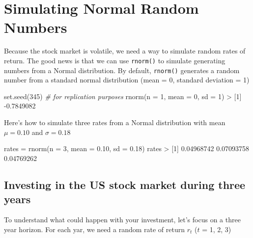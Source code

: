 \documentclass[
]{book}
\newenvironment{Shaded}{\begin{snugshade}}{\end{snugshade}}
\newcommand{\AttributeTok}[1]{\textcolor[rgb]{0.77,0.63,0.00}{#1}}
\newcommand{\CommentTok}[1]{\textcolor[rgb]{0.56,0.35,0.01}{\textit{#1}}}
\newcommand{\DecValTok}[1]{\textcolor[rgb]{0.00,0.00,0.81}{#1}}
\newcommand{\FloatTok}[1]{\textcolor[rgb]{0.00,0.00,0.81}{#1}}
\newcommand{\FunctionTok}[1]{\textcolor[rgb]{0.00,0.00,0.00}{#1}}
\newcommand{\NormalTok}[1]{#1}
\newcommand{\OtherTok}[1]{\textcolor[rgb]{0.56,0.35,0.01}{#1}}
\newcommand{\SpecialCharTok}[1]{\textcolor[rgb]{0.00,0.00,0.00}{#1}}
\begin{document}
\hypertarget{simulating-normal-random-numbers}{%
\section{Simulating Normal Random Numbers}\label{simulating-normal-random-numbers}}

Because the stock market is volatile, we need a way to simulate random rates
of return. The good news is that we can use \texttt{rnorm()} to simulate generating
numbers from a Normal distribution. By default, \texttt{rnorm()} generates a random
number from a standard normal distribution (mean = 0, standard deviation = 1)

\begin{Shaded}
\begin{Highlighting}[]
\FunctionTok{set.seed}\NormalTok{(}\DecValTok{345}\NormalTok{)  }\CommentTok{\# for replication purposes}
\FunctionTok{rnorm}\NormalTok{(}\AttributeTok{n =} \DecValTok{1}\NormalTok{, }\AttributeTok{mean =} \DecValTok{0}\NormalTok{, }\AttributeTok{sd =} \DecValTok{1}\NormalTok{)}
\SpecialCharTok{\textgreater{}}\NormalTok{ [}\DecValTok{1}\NormalTok{] }\SpecialCharTok{{-}}\FloatTok{0.7849082}
\end{Highlighting}
\end{Shaded}

Here's how to simulate three rates from a Normal distribution with mean
\(\mu = 0.10\) and \(\sigma = 0.18\)

\begin{Shaded}
\begin{Highlighting}[]
\NormalTok{rates }\OtherTok{=} \FunctionTok{rnorm}\NormalTok{(}\AttributeTok{n =} \DecValTok{3}\NormalTok{, }\AttributeTok{mean =} \FloatTok{0.10}\NormalTok{, }\AttributeTok{sd =} \FloatTok{0.18}\NormalTok{)}
\NormalTok{rates}
\SpecialCharTok{\textgreater{}}\NormalTok{ [}\DecValTok{1}\NormalTok{] }\FloatTok{0.04968742} \FloatTok{0.07093758} \FloatTok{0.04769262}
\end{Highlighting}
\end{Shaded}

\hypertarget{investing-in-the-us-stock-market-during-three-years}{%
\subsection{Investing in the US stock market during three years}\label{investing-in-the-us-stock-market-during-three-years}}

To understand what could happen with your investment, let's focus on a three
year horizon. For each yar, we need a random rate of return \(r_t\) (\(t\) = 1, 2, 3)
\end{document}
